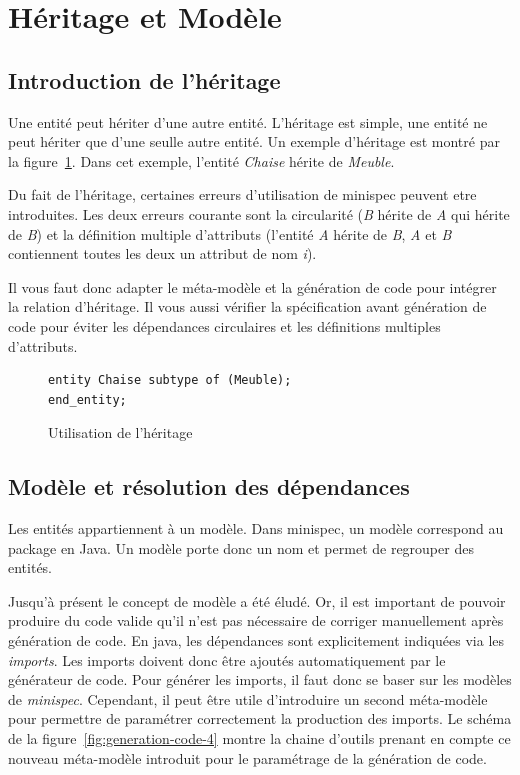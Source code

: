 \documentclass[12pt]{article}
\begin{document}
\section{Héritage et Modèle}

\subsection{Introduction de l'héritage}
Une entité peut hériter d'une autre entité. L'héritage est simple, une entité ne peut hériter que d'une seulle autre entité. Un exemple d'héritage est montré par la figure~\ref{fig:exemple-minispec6}. Dans cet exemple, l'entité \textit{Chaise} hérite de \textit{Meuble}. 

Du fait de l'héritage, certaines erreurs d'utilisation de minispec peuvent etre introduites. Les deux erreurs courante sont la circularité (\textit{B} hérite de \textit{A} qui hérite de \textit{B}) et la définition multiple d'attributs (l'entité \textit{A} hérite de \textit{B}, \textit{A} et \textit{B} contiennent toutes les deux un attribut de nom \textit{i}).

Il vous faut donc adapter le méta-modèle et la génération de code pour intégrer la relation d'héritage. Il vous aussi vérifier la spécification avant génération de code pour éviter les dépendances circulaires et les définitions multiples d'attributs.

\begin{figure}
\begin{lstlisting}[language=express]
entity Chaise subtype of (Meuble);
end_entity;
\end{lstlisting}
\caption{Utilisation de l'héritage}
\label{fig:exemple-minispec6}
\end{figure} 

\subsection{Modèle et résolution des dépendances}
Les entités appartiennent à un modèle. Dans minispec, un modèle correspond au package en Java. Un modèle porte donc un nom et permet de regrouper des entités. 

Jusqu'à présent le concept de modèle a été éludé. Or, il est important de pouvoir produire du code valide qu'il n'est pas nécessaire de corriger manuellement après génération de code. En java, les dépendances sont explicitement indiquées via les \textit{imports}. Les imports doivent donc être ajoutés automatiquement par le générateur de code. Pour générer les imports, il faut donc se baser sur les modèles de \textit{minispec}. Cependant, il peut être utile d'introduire un second méta-modèle pour permettre de paramétrer correctement la production des imports. Le schéma de la figure~\ref{fig:generation-code-4} montre la chaine d'outils prenant en compte ce nouveau méta-modèle introduit pour le paramétrage de la génération de code.
\end{document}
